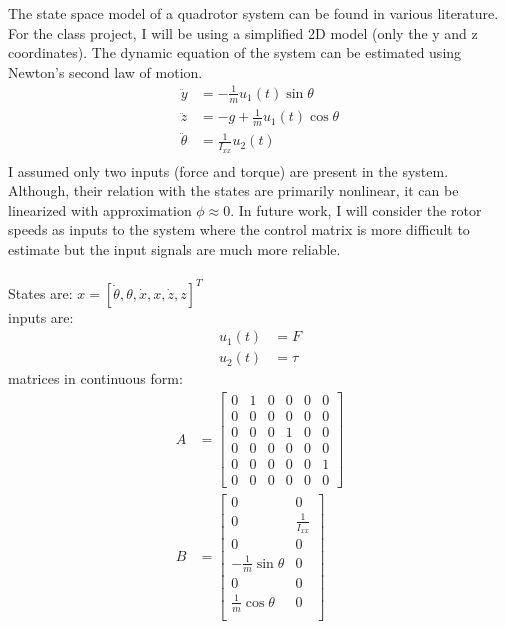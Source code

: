 \documentclass[12pt]{article}
\begin{document}
The state space model of a quadrotor system can be found in various literature\cite{K2019}\cite{Schreier2012}. For the class project, I will be using a simplified 2D model (only the y and z coordinates). The dynamic equation of the system can be estimated using Newton's second law of motion.
\begin{align*}
    \ddot{y} &= -\frac{1}{m}u_1(t) \sin{\theta} \\
    \ddot{z} &= -g + \frac{1}{m}u_1(t) \cos{\theta} \\ 
    \ddot{\theta} &= \frac{1}{I_{xx}}u_2(t) \\
\end{align*}
I assumed only two inputs (force and torque) are present in the system. Although, their relation with the states are primarily nonlinear, it can be linearized with approximation $\phi \approx 0$. In future work, I will consider the rotor speeds as inputs to the system where the control matrix is more difficult to estimate but the input signals are much more reliable. \\\\
States are: $x = [\dot{\theta}, \theta, \dot{x}, x, \dot{z}, z]^T$ \\
inputs are:
\begin{align*}
    u_1(t) &= F \\
    u_2(t) &= \tau
\end{align*}
matrices in continuous form:
\begin{align*}
    A &= \begin{bmatrix}
        0 & 1 & 0 & 0 & 0 & 0 \\
        0 & 0 & 0 & 0 & 0 & 0 \\
        0 & 0 & 0 & 1 & 0 & 0 \\
        0 & 0 & 0 & 0 & 0 & 0 \\
        0 & 0 & 0 & 0 & 0 & 1 \\
        0 & 0 & 0 & 0 & 0 & 0
    \end{bmatrix} \\
    B &= \begin{bmatrix}
        0 & 0 \\
        0 & \frac{1}{I_{xx}} \\
        0 & 0 \\
        - \frac{1}{m} \sin{\theta} & 0 \\
        0 & 0 \\
        \frac{1}{m} \cos{\theta} & 0 \\
    \end{bmatrix} \\
\end{align*}
\end{document}
